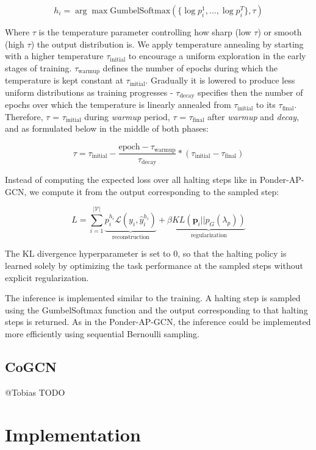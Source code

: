 \documentclass{gdl}
\begin{document}
$$
    h_i = \arg\max \text{GumbelSoftmax}(\{\log p_i^1,...,\log p_i^{T}\}, \tau)
$$

\noindent Where $\tau$ is the temperature parameter controlling how sharp (low $\tau$) or smooth (high $\tau$) the output distribution is. We apply temperature annealing by starting with a higher temperature $\tau_{\text{initial}}$ to encourage a uniform exploration in the early stages of training. $\tau_{\text{warmup}}$ defines the number of epochs during which the temperature is kept constant at $\tau_{\text{initial}}$. Gradually it is lowered to produce less uniform distributions as training progresses - $\tau_{\text{decay}}$ specifies then the number of epochs over which the temperature is linearly annealed from $\tau_{\text{initial}}$ to its $\tau_{\text{final}}$.
Therefore, $\tau$ = $\tau_{\text{initial}}$ during \textit{warmup} period, $\tau$ = $\tau_{\text{final}}$ after \textit{warmup} and \textit{decay}, and as formulated below in the middle of both phases:

$$
\tau = \tau_{\text{initial}} - \frac{\text{epoch} - \tau_{\text{warmup}}}{\tau_{\text{decay}}}  * (\tau_{\text{initial}} - \tau_{\text{final}})
$$

Instead of computing the expected loss over all halting steps like in Ponder-AP-GCN, we compute it from the output corresponding to the sampled step:

$$
L = \sum_{i=1}^{\mathcal{|V|}} \underbrace{p_i^{h_i} \mathcal{L}(y_i, \hat{y}_i^{h_i})}_{\text{reconstruction}} + \beta \underbrace{KL(\mathbf{p}_i || p_G(\lambda_p))}_{\text{regularization}}
$$

\noindent The KL divergence hyperparameter is set to 0, so that the halting policy is learned solely by optimizing the task performance at the sampled steps without explicit regularization. 

The inference is implemented similar to the training. A halting step is sampled using the GumbelSoftmax function and the output corresponding to that halting steps is returned. As in the Ponder-AP-GCN, the inference could be implemented more efficiently using sequential Bernoulli sampling.

\subsection{CoGCN}
@Tobias TODO

\section{Implementation}
\end{document}
